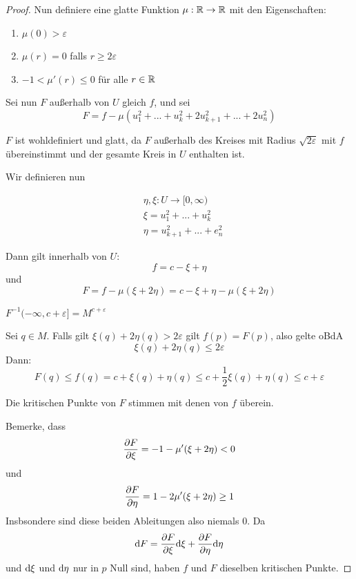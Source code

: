 \begin{proof}
    Nun definiere eine glatte Funktion $\mu: \R \to \R$ mit den Eigenschaften:

    \begin{enumerate}
        \item $ \mu(0) > \varepsilon $
        \item $ \mu(r) = 0 $ falls $ r \geq 2 \varepsilon $
        \item $ -1 < \mu'(r) \leq 0 $ für alle $ r \in \R $
    \end{enumerate}

    Sei nun $F$ außerhalb von $U$ gleich $f$, und sei
    \[ F = f - \mu(u_1^2 + ... + u_k^2 + 2u_{k+1}^2 + ... + 2u_n^2) \]

    $F$ ist wohldefiniert und glatt, da $F$ außerhalb des Kreises mit Radius 
    $\sqrt{2\varepsilon}$ mit $f$ übereinstimmt und der gesamte Kreis in $U$ 
    enthalten ist.

    Wir definieren nun

    \begin{align*}
        & \eta, \xi: U \to [0, \infty) \\
        & \xi = u_1^2 + ... + u_k^2 \\
        & \eta = u_{k + 1}^2 + ... + e_n^2
    \end{align*}

    Dann gilt innerhalb von $U$:
    \[ f = c - \xi + \eta \]
    und 
    \[ F = f - \mu(\xi + 2 \eta) = c - \xi + \eta - \mu(\xi + 2 \eta) \]

     $F^{-1}(-\infty, c + \varepsilon] = M^{c + \varepsilon}$

    Sei $q \in M$. Falls gilt $\xi(q) + 2 \eta(q) > 2 \varepsilon$ gilt $f(p) = F(p)$,
    also gelte oBdA 
    \[ \xi(q) + 2 \eta(q) \leq 2 \varepsilon \]
    Dann:
    \[ F(q) \leq f(q) = c + \xi(q) + \eta(q) \leq c + \frac{1}{2}\xi(q) + \eta(q) \leq c + \varepsilon \]
    \sectiondone

     Die kritischen Punkte von $F$ stimmen mit denen 
    von $f$ überein.

    Bemerke, dass
    \[ \pderive[F]{\xi} = -1 - \mu'(\xi + 2\eta)  < 0 \]
    und
    \[ \pderive[F]{\eta} = 1 - 2 \mu'(\xi + 2\eta) \geq 1 \]
    Insbsondere sind diese beiden Ableitungen also niemals $0$. Da 
    \[ \opd F = \pderive[F]{\xi}\opd \xi + \pderive[F]{\eta} \opd \eta \]
    und $\opd \xi$ und $\opd \eta$ nur in $p$ Null sind, haben $f$ und $F$ 
    dieselben kritischen Punkte.
    \sectiondone


\end{proof}
